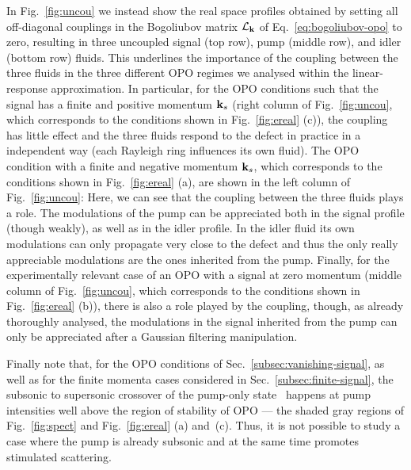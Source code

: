 In Fig.~\ref{fig:uncou} we instead show the real space profiles
obtained by setting all off-diagonal couplings in the Bogoliubov
matrix $\mathcal{L}_{\mathbf{k}}$ of Eq.~\eqref{eq:bogoliubov-opo} to
zero, resulting in three uncoupled signal (top row), pump (middle
row), and idler (bottom row) fluids. This underlines the importance of
the coupling between the three fluids in the three different OPO
regimes we analysed within the linear-response approximation. In
particular, for the OPO conditions such that the signal has a finite
and positive momentum $\mathbf{k}_s$ (right column of
Fig.~\ref{fig:uncou}, which corresponds to the conditions shown in
Fig.~\ref{fig:ereal} (c)), the coupling has little effect and the
three fluids respond to the defect in practice in a independent way
(each Rayleigh ring influences its own fluid). The OPO condition with
a finite and negative momentum $\mathbf{k}_s$, which corresponds to the
conditions shown in Fig.~\ref{fig:ereal} (a), are shown in the left
column of Fig.~\ref{fig:uncou}: Here, we can see that the coupling
between the three fluids plays a role. The modulations of the pump can
be appreciated both in the signal profile (though weakly), as well as
in the idler profile. In the idler fluid its own modulations can only
propagate very close to the defect and thus the only really
appreciable modulations are the ones inherited from the pump. Finally,
for the experimentally relevant case of an OPO with a signal at zero
momentum (middle column of Fig.~\ref{fig:uncou}, which corresponds to
the conditions shown in Fig.~\ref{fig:ereal} (b)), there is also a
role played by the coupling, though, as already thoroughly analysed,
the modulations in the signal inherited from the pump can only be
appreciated after a Gaussian filtering manipulation.

Finally note that, for the OPO conditions of
Sec.~\ref{subsec:vanishing-signal}, as well as for the finite momenta
cases considered in Sec.~\ref{subsec:finite-signal}, the subsonic to
supersonic crossover of the pump-only state~\cite{Amo_2009} happens at
pump intensities well above the region of stability of OPO --- the
shaded gray regions of Fig.~\ref{fig:spect} and Fig.~\ref{fig:ereal}
(a) and~(c). Thus, it is not possible to study a case where the pump
is already subsonic and at the same time promotes stimulated
scattering.

